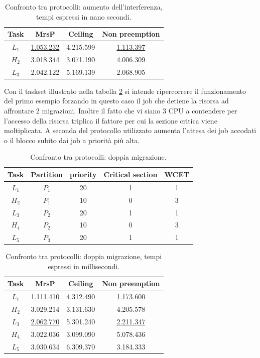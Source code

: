 \begin{table}
  \centering
  \begin{tabular}{cccc}
  \hline\hline
    Task & MrsP & Ceiling & Non preemption \\ \hline
    $L_1$ & \underline{1.053.232} & 4.215.599 & \underline{1.113.397} \\
    $H_2$ & 3.018.344 & 3.071.190 & 4.006.309 \\
    $L_3$ & 2.042.122 & 5.169.139 & 2.068.905 \\
    \hline
    \end{tabular}
    \caption{Confronto tra protocolli: aumento dell'interferenza, tempi espressi in nano secondi.}
  \label{tab:test_protocols_Taskset3_ris}
  \end{table}

\noindent Con il taskset illustrato nella tabella \ref{tab:test_protocols_Taskset4} si intende ripercorrere il funzionamento del primo esempio forzando in questo caso il job che detiene la risorsa ad affrontare 2 migrazioni. Inoltre il fatto che vi siano 3 CPU a contendere per l'accesso della risorsa triplica il fattore per cui la sezione critica viene moltiplicata. A seconda del protocollo utilizzato aumenta l'attesa dei job accodati o il blocco subito dai job a priorità più alta.\\

\begin{table}
  \centering
  \begin{tabular}{ccccc}
  \hline\hline
    Task & Partition     & priority & Critical section & WCET  \\ \hline
    $L_1$ & $P_1$  & 20 & 1 & 1 \\
    $H_2$ & $P_1$  & 10 & 0 & 3 \\
    $L_3$ & $P_2$  & 20 & 1 & 1 \\
    $H_4$ & $P_2$  & 10 & 0 & 3 \\
    $L_5$ & $P_3$  & 20 & 1 & 1 \\
    \hline
    \end{tabular}
    \caption{Confronto tra protocolli: doppia migrazione.}
  \label{tab:test_protocols_Taskset4}
  \end{table}

  \begin{table}
  \centering
  \begin{tabular}{cccc}
  \hline\hline
    Task & MrsP & Ceiling & Non preemption \\ \hline
    $L_1$ & \underline{1.111.410} & 4.312.490 & \underline{1.173.600} \\
    $H_2$ & 3.029.214 & 3.131.630 & 4.205.578 \\
    $L_3$ & \underline{2.062.770} & 5.301.240 & \underline{2.211.347} \\
    $H_4$ & 3.022.036 & 3.099.090 & 5.078.436 \\
    $L_5$ & 3.030.634 & 6.309.370 & 3.184.333 \\
    \hline
    \end{tabular}
    \caption{Confronto tra protocolli: doppia migrazione, tempi espressi in millisecondi.}
  \label{tab:test_protocols_Taskset4_ris}
  \end{table}

